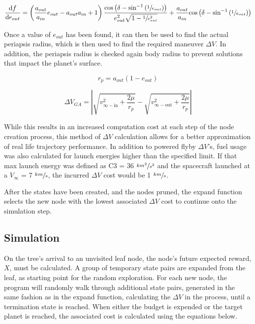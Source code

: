 \documentclass[letterpaper, preprint, paper,11pt]{AAS}	%
\begin{document}
\begin{equation}
    \frac{\text{d}f}{\text{d}e_{out}} = \left( \frac{a_{out}}{a_{in}}e_{out} - a_{out}{a_{in}} + 1 \right) \frac{ \text{cos}\left( \delta - \text{sin}^{-1} \left( \sfrac{1}{e_{out}} \right) \right) }{ e_{out}^{2} \sqrt{1 - \sfrac{1}{e_{out}^{2}} } } + \frac{a_{out}}{a_{in}}\text{cos}\left( \delta - \text{sin}^{-1} \left( \sfrac{1}{e_{out}} \right) \right)
\end{equation}

Once a value of $e_{out}$ has been found, it can then be used to find the actual periapsis radius, which is then used to find the required maneuver $\Delta V$. In addition, the periapsis radius is checked again body radius to prevent solutions that impact the planet's surface. 

\begin{equation}
    r_p = a_{out}(1 - e_{out})
\end{equation}

\begin{equation}
    \Delta V_{GA} = \left| \sqrt{ v^2_{\infty-\text{in}} + \frac{2\mu}{r_p} } - \sqrt{ v^2_{\infty-\text{out}} + \frac{2\mu}{r_p} } \right|
\end{equation}

While this results in an increased computation cost at each step of the node creation process, this method of $\Delta V$ calculation allows for a better approximation of real life trajectory performance. In addition to powered flyby $\Delta V$'s, fuel usage was also calculated for launch energies higher than the specified limit. If that max launch energy was defined as C3 = 36 $\sfrac{km^2}{s^2}$ and the spacecraft launched at a $V_\infty$ = 7 $\sfrac{km}{s}$, the incurred $\Delta V$ cost would be 1 $\sfrac{km}{s}$. 

After the states have been created, and the nodes pruned, the expand function selects the new node with the lowest associated $\Delta V$ cost to continue onto the simulation step.

\subsection{Simulation}

On the tree's arrival to an unvisited leaf node, the node's future expected reward, $X$, must be calculated. A group of temporary state pairs are expanded from the leaf, as starting point for the random exploration. For each new node, the program will randomly walk through additional state pairs, generated in the same fashion as in the expand function, calculating the $\Delta V$ in the process, until a termination state is reached. When either the budget is expended or the target planet is reached, the associated cost is calculated using the equations below.
\end{document}
